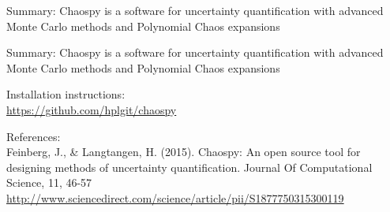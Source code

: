 \documentclass[handout]{beamer}
\begin{document}
\begin{frame}{Summary: Chaospy is a software for uncertainty quantification with advanced Monte Carlo methods and Polynomial Chaos expansions}
\end{frame}


  \begin{frame}{Summary: Chaospy is a software for uncertainty quantification with advanced Monte Carlo methods and Polynomial Chaos expansions}
  \begin{alert}{Installation instructions:}\\
  \scriptsize
      \href{https://github.com/hplgit/chaospy}{https://github.com/hplgit/chaospy}\\
  \end{alert}


\vspace{7mm}

  \begin{alert}{References:}\\
  \scriptsize
      Feinberg, J., \& Langtangen, H. (2015). Chaospy: An open source tool for designing methods of uncertainty quantification. Journal Of Computational Science, 11, 46-57\\
      \href{http://www.sciencedirect.com/science/article/pii/S1877750315300119}{http://www.sciencedirect.com/science/article/pii/S1877750315300119}
  \end{alert}







\end{frame}
\end{document}

